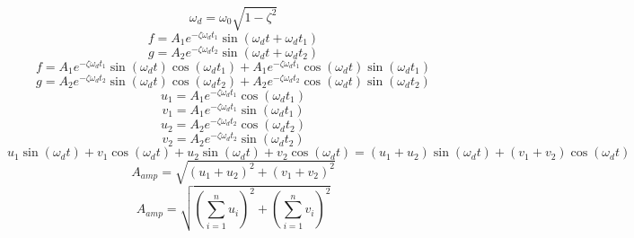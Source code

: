 \documentclass{article}
\begin{document}
\[\omega_d = \omega_0 \sqrt{1 - \zeta^2} \]
\[f = A_1 e^{-\zeta \omega_d t_1} \sin{(\omega_d t + \omega_d t_1)}\]
\[g = A_2 e^{-\zeta \omega_d t_2} \sin{(\omega_d t + \omega_d t_2)}\]
\[f = A_1 e^{-\zeta \omega_d t_1} \sin{(\omega_d t)} \cos{(\omega_d t_1)} + A_1 e^{-\zeta \omega_d t_1} \cos{(\omega_d t)} \sin{(\omega_d t_1)} \]
\[g = A_2 e^{-\zeta \omega_d t_2} \sin{(\omega_d t)} \cos{(\omega_d t_2)} + A_2 e^{-\zeta \omega_d t_2} \cos{(\omega_d t)} \sin{(\omega_d t_2)} \]
\[u_1 = A_1 e^{-\zeta \omega_d t_1} \cos{(\omega_d t_1)} \]
\[v_1 = A_1 e^{-\zeta \omega_d t_1} \sin{(\omega_d t_1)} \]
\[u_2 = A_2 e^{-\zeta \omega_d t_2} \cos{(\omega_d t_2)} \]
\[v_2 = A_2 e^{-\zeta \omega_d t_2} \sin{(\omega_d t_2)} \]
\[u_1 \sin{(\omega_d t)} + v_1 \cos{(\omega_d t)} + u_2 \sin{(\omega_d t)} + v_2 \cos{(\omega_d t)} = (u_1 + u_2) \sin{(\omega_d t)} + (v_1 + v_2) \cos{(\omega_d t)}\]
\[A_{amp} = \sqrt{(u_1 + u_2)^2 + (v_1 + v_2)^2} \]
\[A_{amp} = \sqrt{(\sum_{i=1}^{n} {u_i})^2 + (\sum_{i=1}^{n} {v_i})^2} \]
\end{document}
